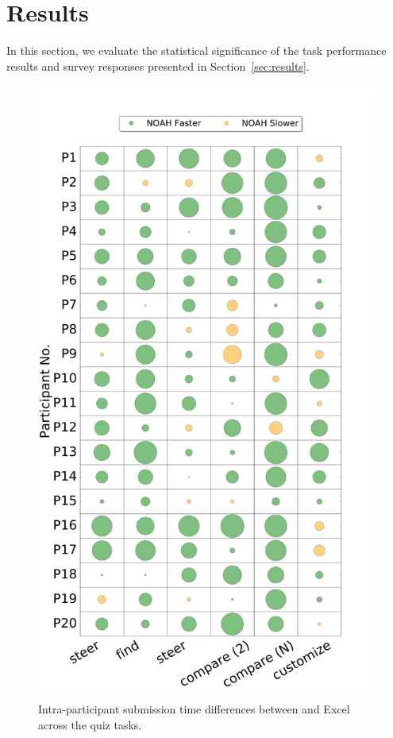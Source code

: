 \section*{Results}
In this section, we evaluate the statistical significance of the task performance results and survey responses presented in Section~\ref{sec:results}. 
\begin{figure}
    \centering
    \includegraphics[trim=0 50 0 145,clip,width=\linewidth]{images/userinfo-ip-1.pdf}
   \caption{Intra-participant submission time differences between \noah and Excel across the quiz tasks.}
   \label{fig:ipdiff}
 \end{figure}

